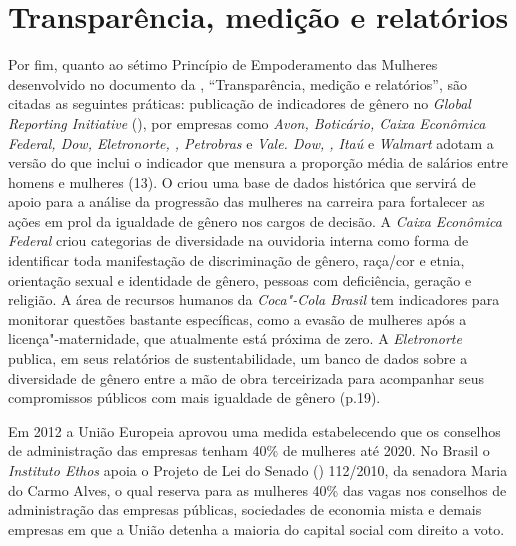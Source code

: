 \section{Transparência, medição e relatórios}

Por fim, quanto ao sétimo Princípio de Empoderamento das Mulheres
desenvolvido no documento da , ``Transparência, medição e
relatórios'', são citadas as seguintes práticas: publicação de
indicadores de gênero no \emph{Global Reporting Initiative} (), por
empresas como \emph{Avon, Boticário, Caixa Econômica Federal, Dow,
Eletronorte, , Petrobras} e \emph{Vale. Dow, , Itaú} e
\emph{Walmart} adotam a versão do  que inclui o indicador que mensura
a proporção média de salários entre homens e mulheres (13). O
\emph{} criou uma base de dados histórica que servirá de apoio para
a análise da progressão das mulheres na carreira para fortalecer as
ações em prol da igualdade de gênero nos cargos de decisão. A
\emph{Caixa Econômica Federal} criou categorias de diversidade na
ouvidoria interna como forma de identificar toda manifestação de
discriminação de gênero, raça/cor e etnia, orientação sexual e
identidade de gênero, pessoas com deficiência, geração e religião. A
área de recursos humanos da \emph{Coca"-Cola Brasil} tem indicadores para
monitorar questões bastante específicas, como a evasão de mulheres após
a licença"-maternidade, que atualmente está próxima de zero. A
\emph{Eletronorte} publica, em seus relatórios de sustentabilidade, um
banco de dados sobre a diversidade de gênero entre a mão de obra
terceirizada para acompanhar seus compromissos públicos com mais
igualdade de gênero (p.19).

Em 2012 a União Europeia aprovou uma medida estabelecendo que os
conselhos de administração das empresas tenham 40\% de mulheres até
2020. No Brasil o \emph{Instituto Ethos} apoia o Projeto de Lei do
Senado () 112/2010, da senadora Maria do Carmo Alves, o qual reserva
para as mulheres 40\% das vagas nos conselhos de administração das
empresas públicas, sociedades de economia mista e demais empresas em que
a União detenha a maioria do capital social com direito a voto.

